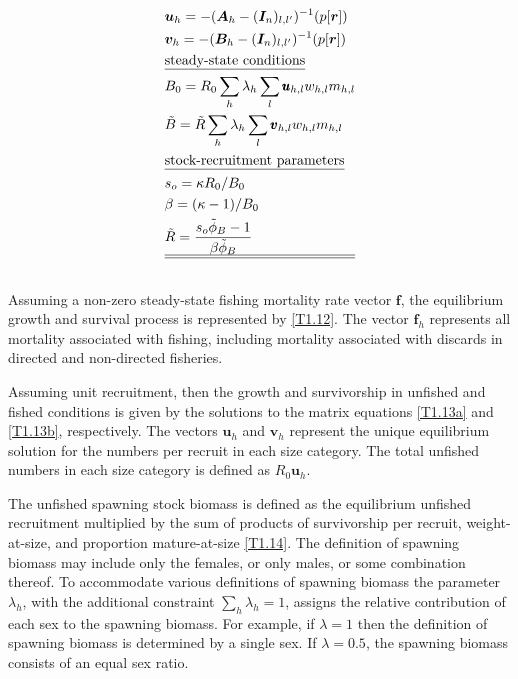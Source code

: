 \documentclass[12pt,letterpaper]{article}
\newcounter{saveEq}
\def\getEq{\setcounter{equation}{\value{saveEq}}}
\def\normalEq{ %
    \getEq
    \renewcommand{\theequation}{\arabic{section}.\arabic{equation}}}
\begin{document}
\begin{table}
\begin{align}
    & \bm{u}_h   = -(\bm{A}_h - (\bm{I}_n)_{l,l'})^{-1} (p[\bm{r}]) \label{T1.13a}\\
    & \bm{v}_h   = -(\bm{B}_h - (\bm{I}_n)_{l,l'})^{-1} (p[\bm{r}]) \label{T1.13b}\\
    &\mbox{\underline{steady-state conditions}}\nonumber \\
    & B_0 = R_0 \sum_h \lambda_h \sum_l \pmb{u}_{h,l} w_{h,l} m_{h,l} \label{T1.14}\\
    & \tilde{B} = \tilde{R}\sum_h \lambda_h \sum_l \pmb{v}_{h,l} w_{h,l} m_{h,l} \label{T1.16}\\
    &\mbox{\underline{stock-recruitment parameters}}\nonumber\\
    &s_o = \kappa R_0 / B_0 \label{T1.17}\\
    &\beta = (\kappa -1)/B_0 \label{T1.18}\\
    &\tilde{R} = \frac{s_o \tilde{\phi}_B -1}{\beta \tilde{\phi}_B} \label{T1.19}\\
    \hline \hline \nonumber
  \end{align}
\normalEq
\end{table}

    Assuming a non-zero steady-state fishing mortality rate vector $\pmb{f}$, the equilibrium growth and survival process is represented by \eqref{T1.12}.  The vector $\bm{f}_h$ represents all mortality associated with fishing, including mortality associated with discards in directed and non-directed fisheries.

    Assuming unit recruitment, then the growth and survivorship in unfished and fished conditions is given by the solutions to the matrix equations \eqref{T1.13a} and \eqref{T1.13b}, respectively.   The vectors $\bm{u}_h$ and $\bm{v}_h$ represent the unique equilibrium solution for the numbers per recruit in each size category.  The total unfished numbers in each size category is defined as $R_0 \bm{u}_h$.

    The unfished spawning stock biomass is defined as the equilibrium unfished recruitment multiplied by the sum of products of survivorship per recruit, weight-at-size, and proportion mature-at-size \eqref{T1.14}.  The definition of spawning  biomass may include only the females, or only males, or some combination thereof. To accommodate various definitions of spawning biomass the parameter $\lambda_h$, with the additional constraint $\sum_h \lambda_h = 1$, assigns the relative contribution of each sex to the spawning biomass.  For example, if $\lambda = 1$  then the definition of spawning biomass is determined by a single sex. If $\lambda = 0.5$, the spawning biomass consists of an equal sex ratio.
\end{document}
